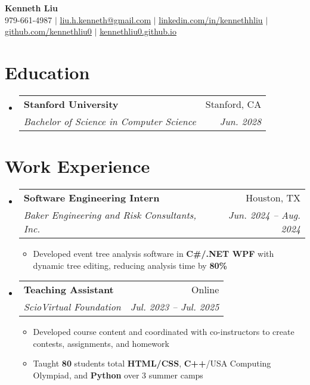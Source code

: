 \documentclass[letterpaper,11pt]{article}
\makeatletter
\newcommand{\resumeItem}[1]{
  \item\small{
    {#1 \vspace{-2pt}}
  }
}
\newcommand{\resumeSubheading}[4]{
  \vspace{-2pt}\item
    \begin{tabular*}{0.97\textwidth}[t]{l@{\extracolsep{\fill}}r}
      \textbf{#1} & #2 \\
      \textit{\small#3} & \textit{\small #4} \\
    \end{tabular*}\vspace{-7pt}
}
\newcommand{\resumeSubHeadingListStart}{\begin{itemize}[leftmargin=0.15in, label={}]}
\newcommand{\resumeSubHeadingListEnd}{\end{itemize}}
\newcommand{\resumeItemListStart}{\begin{itemize}}
\newcommand{\resumeItemListEnd}{\end{itemize}\vspace{-5pt}}
\makeatother
\begin{document}

\begin{center}
    \textbf{\Huge  Kenneth Liu} \\ \vspace{1pt}
    \small 979-661-4987 $|$ \href{mailto:liu.h.kenneth@gmail.com}{\underline{liu.h.kenneth@gmail.com}} $|$ 
    \href{https://www.linkedin.com/in/kennethhliu}{\underline{linkedin.com/in/kennethhliu}}
    $|$ 
    \href{https://github.com/kennethliu0}{\underline{github.com/kennethliu0}} $|$ \href{https://kennethliu0.github.io}{\underline{kennethliu0.github.io}}
\end{center}


\section{Education}
  \resumeSubHeadingListStart
    \resumeSubheading
      {Stanford University}{Stanford, CA}
      {Bachelor of Science in Computer Science}{Jun. 2028}
  \resumeSubHeadingListEnd


\section{Work Experience}
  \resumeSubHeadingListStart
     \resumeSubheading
      {Software Engineering Intern}{Houston, TX}
      {Baker Engineering and Risk Consultants, Inc.}{Jun. 2024 -- Aug. 2024}
      \resumeItemListStart
        \resumeItem{Developed event tree analysis software in \textbf{C\#/.NET WPF} with dynamic tree editing, reducing analysis time by \textbf{80\%}}
      \resumeItemListEnd
    \resumeSubheading
      {Teaching Assistant}{Online}
      {ScioVirtual Foundation}{Jul. 2023 -- Jul. 2025}
      \resumeItemListStart
        \resumeItem{Developed course content and coordinated with co-instructors to create contests, assignments, and homework}
        \resumeItem{Taught \textbf{80} students total \textbf{HTML/CSS}, \textbf{C++}/USA Computing Olympiad, and \textbf{Python} over 3 summer camps}
      \resumeItemListEnd
  \resumeSubHeadingListEnd
\end{document}
